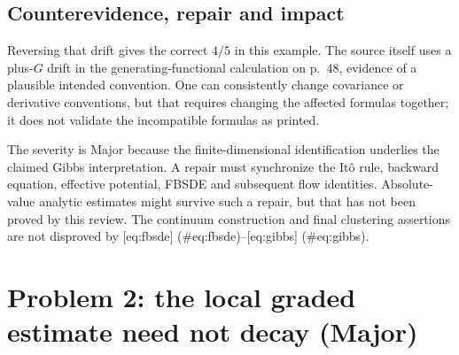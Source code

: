 \documentclass[10pt]{article}
\begin{document}
\subsection*{Counterevidence, repair and impact}
Reversing that drift gives the correct \(4/5\) in this example. The source itself uses a plus-\(G\) drift in the generating-functional calculation on p. 48, evidence of a plausible intended convention. One can consistently change covariance or derivative conventions, but that requires changing the affected formulas together; it does not validate the incompatible formulas as printed.\par
The severity is Major because the finite-dimensional identification underlies the claimed Gibbs interpretation. A repair must synchronize the Itô rule, backward equation, effective potential, FBSDE and subsequent flow identities. Absolute-value analytic estimates might survive such a repair, but that has not been proved by this review. The continuum construction and final clustering assertions are not disproved by [eq:fbsde] (\#eq:fbsde)–[eq:gibbs] (\#eq:gibbs).\par
\section*{Problem 2: the local graded estimate need not decay (Major)}
\end{document}
